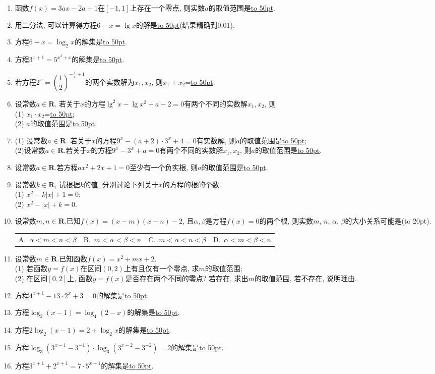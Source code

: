 \documentclass[10pt,a4paper]{article}
\newcommand{\blank}[1]{\underline{\hbox to #1pt{}}}
\newcommand{\bracket}[1]{(\hbox to #1pt{})}
\newcommand{\fourch}[4]{\par\begin{tabular}{p{.23\textwidth}p{.23\textwidth}p{.23\textwidth}p{.23\textwidth}}
A.~#1 &B.~#2& C.~#3& D.~#4
\end{tabular}}
\begin{document}
\begin{enumerate}[1.]
\item 函数$f(x)=3ax-2a+1$在$[-1,1]$上存在一个零点, 则实数$a$的取值范围是\blank{50}.
\item 用二分法, 可以计算得方程$6-x=\lg x$的解是\blank{50}(结果精确到0.01).
\item 方程$6-x=\log_2 x$的解集是\blank{50}.
\item 方程$3^{x+1}=5^{x^2+x}$的解集是\blank{50}.
\item 若方程$2^x=(\dfrac 12)^{-\frac 1x+1}$的两个实数解为$x_1, x_2$, 则$x_1+x_2$=\blank{50}.
\item 设常数$a\in \mathbf{R}$. 若关于$x$的方程$\lg^2x-\lg x^2+a-2=0$有两个不同的实数解$x_1, x_2$, 则\\
(1) $x_1\cdot x_2$=\blank{50};\\
(2) $a$的取值范围是\blank{50}.
\item (1) 设常数$a\in \mathbf{R}$. 若关于$x$的方程$9^x-(a+2)\cdot 3^x+4=0$有实数解, 则$a$的取值范围是\blank{50};\\
(2)设常数$a\in \mathbf{R}$.若关于$x$的方程$9^x-3^x+a=0$有两个不同的实数解$x_1, x_2$, 则$a$的取值范围是\blank{50}.
\item 设常数$a\in \mathbf{R}$.若方程$ax^2+2x+1=0$至少有一个负实根, 则$a$的取值范围是\blank{50}.
\item 设常数$k\in \mathbf{R}$, 试根据$k$的值, 分别讨论下列关于$x$的方程的根的个数.\\
(1) $x^2-k|x|+1=0$;\\
(2) $x^2-|x|+k=0$.
\item 设常数$m,n\in \mathbf{R}$.已知$f(x)=(x-m)(x-n)-2$, 且$\alpha ,\beta$是方程$f(x)=0$的两个根, 则实数$m$, $n$, $\alpha$, $\beta$的大小关系可能是\bracket{20}.
\fourch{$\alpha<m<n<\beta$}{$m<\alpha<\beta<n$}{$m<\alpha<n<\beta$}{$\alpha<m<\beta<n$	}
\item 设常数$m\in \mathbf{R}$.已知函数$f(x)=x^2+mx+2$.\\
(1) 若函数$y=f(x)$在区间$(0, 2)$上有且仅有一个零点, 求$m$的取值范围;\\
(2) 在区间$[0,2]$上, 函数$y=f(x)$是否存在两个不同的零点? 若存在, 求出$m$的取值范围, 若不存在, 说明理由.
\item 方程$4^{x+1}-13\cdot 2^x+3=0$的解集是\blank{50}.
\item 方程$\log_2(x-1)=\log_4(2-x)$的解集是\blank{50}.
\item 方程$2\log_2(x-1)=2+\log_2 x$的解集是\blank{50}.
\item 方程$\log_3(3^{x-1}-3^{-1})\cdot \log_3(3^{x-2}-3^{-2})=2$的解集是\blank{50}.
\item 方程$3^{x+1}+2^{x+1}=7\cdot 5^{x-1}$的解集是\blank{50}.

\end{enumerate}
\end{document}
